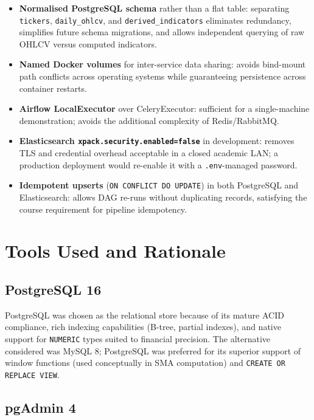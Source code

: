 \documentclass[conference]{IEEEtran}
\begin{document}
\begin{itemize}
  \item \textbf{Normalised PostgreSQL schema} rather than a flat table: separating
    \texttt{tickers}, \texttt{daily\_ohlcv}, and \texttt{derived\_indicators}
    eliminates redundancy, simplifies future schema migrations, and allows
    independent querying of raw OHLCV versus computed indicators.
  \item \textbf{Named Docker volumes} for inter-service data sharing: avoids
    bind-mount path conflicts across operating systems while guaranteeing
    persistence across container restarts.
  \item \textbf{Airflow LocalExecutor} over CeleryExecutor: sufficient for a
    single-machine demonstration; avoids the additional complexity of Redis/RabbitMQ.
  \item \textbf{Elasticsearch \texttt{xpack.security.enabled=false}} in development:
    removes TLS and credential overhead acceptable in a closed academic LAN;
    a production deployment would re-enable it with a \texttt{.env}-managed
    password.
  \item \textbf{Idempotent upserts} (\texttt{ON CONFLICT DO UPDATE}) in both
    PostgreSQL and Elasticsearch: allows DAG re-runs without duplicating records,
    satisfying the course requirement for pipeline idempotency.
\end{itemize}

\section{Tools Used and Rationale}

\subsection{PostgreSQL 16}

PostgreSQL was chosen as the relational store because of its mature ACID
compliance, rich indexing capabilities (B-tree, partial indexes), and native
support for \texttt{NUMERIC} types suited to financial precision. The alternative
considered was MySQL 8; PostgreSQL was preferred for its superior support of
window functions (used conceptually in SMA computation) and \texttt{CREATE OR
REPLACE VIEW}.

\subsection{pgAdmin 4}
\end{document}
